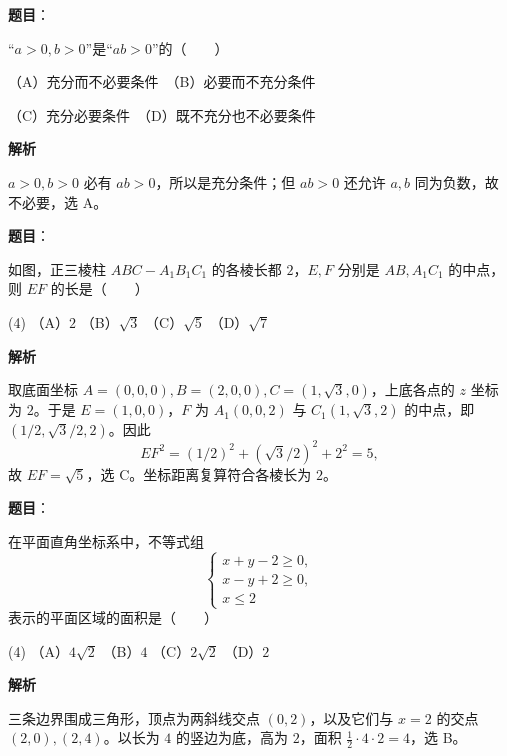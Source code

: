 \begin{answer}

\textbf{题目}：

“$a>0,b>0$”是“$ab>0$”的\mbox{（　　）}

（A）充分而不必要条件　（B）必要而不充分条件

（C）充分必要条件　（D）既不充分也不必要条件

\textbf{解析}

$a>0,b>0$ 必有 $ab>0$，所以是充分条件；但 $ab>0$ 还允许 $a,b$ 同为负数，故不必要，选 A。


\end{answer}
\begin{answer}

\textbf{题目}：

如图，正三棱柱 $ABC-A_1B_1C_1$ 的各棱长都 $2$，$E,F$ 分别是 $AB,A_1C_1$ 的中点，则 $EF$ 的长是\mbox{（　　）}
\nopagebreak[4]
\begin{center}\end{center}
\nopagebreak[4]
\begin{gkopts}(4)
\task （A）$2$
\task （B）$\sqrt3$
\task （C）$\sqrt5$
\task （D）$\sqrt7$
\end{gkopts}

\textbf{解析}

取底面坐标 $A=(0,0,0), B=(2,0,0), C=(1,\sqrt3,0)$，上底各点的 $z$ 坐标为 $2$。于是 $E=(1,0,0)$，$F$ 为 $A_1(0,0,2)$ 与 $C_1(1,\sqrt3,2)$ 的中点，即 $(1/2,\sqrt3/2,2)$。因此
\nopagebreak[4]
\[
 EF^2=(1/2)^2+(\sqrt3/2)^2+2^2=5,
\]
故 $EF=\sqrt5$，选 C。坐标距离复算符合各棱长为 $2$。


\end{answer}
\begin{answer}

\textbf{题目}：

在平面直角坐标系中，不等式组
\nopagebreak[4]
\[
\begin{cases}
x+y-2\geqslant 0,\\
x-y+2\geqslant 0,\\
x\leqslant 2
\end{cases}
\]
表示的平面区域的面积是\mbox{（　　）}

\begin{gkopts}(4)
\task （A）$4\sqrt2$
\task （B）$4$
\task （C）$2\sqrt2$
\task （D）$2$
\end{gkopts}

\textbf{解析}

三条边界围成三角形，顶点为两斜线交点 $(0,2)$，以及它们与 $x=2$ 的交点 $(2,0),(2,4)$。以长为 $4$ 的竖边为底，高为 $2$，面积 $\frac12\cdot4\cdot2=4$，选 B。


\end{answer}
